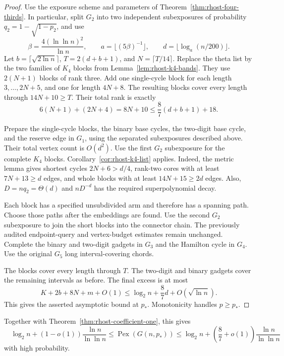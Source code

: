 \begin{proof}
Use the exposure scheme and parameters of Theorem~\ref{thm:rhost-four-thirds}.
In particular, split $G_2$ into two independent subexposures of probability
$q_2=1-\sqrt{1-p_2}$, and use
\[
 \beta=\frac{4(\ln\ln n)^2}{\ln n},\qquad
 a=\lfloor(5\beta)^{-1}\rfloor,
 \qquad d=\lfloor\log_a(n/200)\rfloor.
\]
Let $b=\lceil\sqrt{2\ln n}\rceil$, $T=2(d+b+1)$, and $N=\lceil T/14\rceil$.
Replace the theta list by the two families of $K_4$ blocks from Lemma~\ref{lem:rhost-k4-bands}.
They use $2(N+1)$ blocks of rank three.
Add one single-cycle block for each length $3,\ldots,2N+5$, and one for length $4N+8$.
The resulting blocks cover every length through $14N+10\ge T$.
Their total rank is exactly
\[
 6(N+1)+(2N+4)=8N+10
 \le\frac87(d+b+1)+18.
\]

Prepare the single-cycle blocks, the binary base cycles, the two-digit base cycle,
and the reserve edge in $G_1$, using the separated subexposures described above.
Their total vertex count is $O(d^2)$.
Use the first $G_2$ subexposure for the complete $K_4$ blocks.
Corollary~\ref{cor:rhost-k4-list} applies.
Indeed, the metric lemma gives shortest cycles $2N+6>d/4$,
rank-two cores with at least $7N+13\ge d$ edges, and whole blocks with at least $14N+15\ge2d$ edges.
Also, $D=nq_2=\Theta(d)$ and $nD^{-d}$ has the required superpolynomial decay.

Each block has a specified unsubdivided arm and therefore has a spanning path.
Choose those paths after the embeddings are found.
Use the second $G_2$ subexposure to join the short blocks into the connector chain.
The previously audited endpoint-query and vertex-budget estimates remain unchanged.
Complete the binary and two-digit gadgets in $G_3$ and the Hamilton cycle in $G_4$.
Use the original $G_5$ long interval-covering chords.

The blocks cover every length through $T$.
The two-digit and binary gadgets cover the remaining intervals as before.
The final excess is at most
\[
 K+2b+8N+m+O(1)
 \le\log_2n+\frac87d+O(\sqrt{\ln n}).
\]
This gives the asserted asymptotic bound at $p_*$.
Monotonicity handles $p\ge p_*$.
\end{proof}

Together with Theorem~\ref{thm:rhost-coefficient-one}, this gives
\[
 \boxed{\quad
 \log_2n+(1-o(1))\frac{\ln n}{\ln\ln n}
 \le\operatorname{Pex}(G(n,p_*))
 \le\log_2n+\left(\frac87+o(1)\right)\frac{\ln n}{\ln\ln n}
 \quad}
\]
with high probability.
